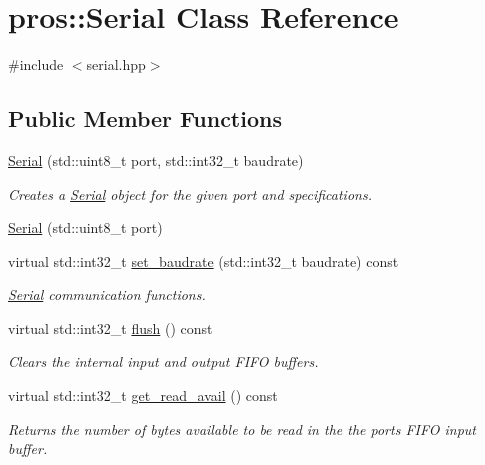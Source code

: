 \hypertarget{classpros_1_1Serial}{}\section{pros\+:\+:Serial Class Reference}
\label{classpros_1_1Serial}


{\ttfamily \#include $<$serial.\+hpp$>$}

\subsection*{Public Member Functions}
\begin{DoxyCompactItemize}
\item 
\hyperlink{classpros_1_1Serial_a20b7c3c88af816af3078939b048dcf4b}{Serial} (std\+::uint8\+\_\+t port, std\+::int32\+\_\+t baudrate)
\begin{DoxyCompactList}\small\item\em Creates a \hyperlink{classpros_1_1Serial}{Serial} object for the given port and specifications. \end{DoxyCompactList}\item 
\hyperlink{classpros_1_1Serial_a32311eebb33cab5a52e0a8743d3bd9da}{Serial} (std\+::uint8\+\_\+t port)
\item 
virtual std\+::int32\+\_\+t \hyperlink{classpros_1_1Serial_ab8c6d804852e6689d6c92c6b2c439824}{set\+\_\+baudrate} (std\+::int32\+\_\+t baudrate) const
\begin{DoxyCompactList}\small\item\em \hyperlink{classpros_1_1Serial}{Serial} communication functions. \end{DoxyCompactList}\item 
virtual std\+::int32\+\_\+t \hyperlink{classpros_1_1Serial_a4d897c6f3f83636f4d4627ab02c10e76}{flush} () const
\begin{DoxyCompactList}\small\item\em Clears the internal input and output F\+I\+FO buffers. \end{DoxyCompactList}\item 
virtual std\+::int32\+\_\+t \hyperlink{classpros_1_1Serial_aca502997319088ea71cf870fbbca7eb8}{get\+\_\+read\+\_\+avail} () const
\begin{DoxyCompactList}\small\item\em Returns the number of bytes available to be read in the the port\textquotesingle{}s F\+I\+FO input buffer. \end{DoxyCompactList}\item 

\end{DoxyCompactItemize}
